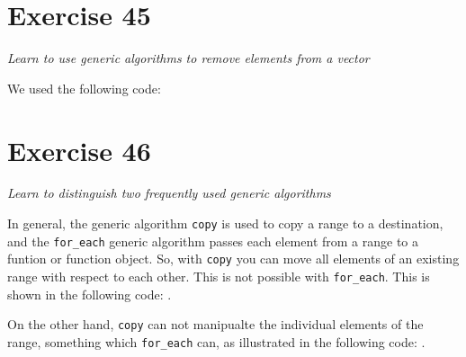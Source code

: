 \documentclass[12pt]{article}
\newcommand{\desc}[1]{\textit{#1} \vspace{1em}}
\begin{document}



\clearpage

\section*{Exercise 45}
\desc{Learn to use generic algorithms to remove elements from a vector}

We used the following code:


\clearpage

\section*{Exercise 46}
\desc{Learn to distinguish two frequently used generic algorithms}

In general, the generic algorithm \texttt{copy} is used to copy a range to a destination, and the \texttt{for\_each} generic algorithm passes each element from a range to a funtion or function object. So, with \texttt{copy} you can move all elements of an existing range with respect to each other. This is not possible with \texttt{for\_each}. This is shown in the following code:
.

On the other hand, \texttt{copy} can not manipualte the individual elements of the range, something which \texttt{for\_each} can, as illustrated in the following code:
.


\clearpage
\end{document}
